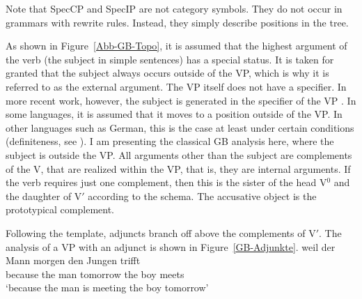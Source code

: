 Note that SpecCP and SpecIP are not category symbols. They do not occur in grammars with rewrite rules. Instead, they simply describe
positions in the tree.%


As shown in Figure~\ref{Abb-GB-Topo}, it is assumed that the highest argument of the verb (the subject in simple sentences) 
has a special status. It is taken for granted that the subject always occurs outside of the VP, which is why it is referred
to as the external argument. The VP itself does not have a specifier. In more recent work, however, the subject
is generated in the specifier of the VP \citep{FS86a-u,KS91a-u}. In some languages, it is assumed that it moves to a position
outside of the VP. In other languages such as German, this is the case at least under certain conditions (\eg definiteness, see
\citealp{Diesing92a}). I am presenting the classical GB analysis here, where the subject is outside the VP. All arguments other than
the subject are complements of the V, that are realized within the VP, that is, they are internal arguments. If the verb requires just one complement, then this is the
sister of the head V$^0$ and the daughter of V$'$ according to the \xbar schema. The accusative object is the prototypical complement.

Following the \xbar template, adjuncts branch off above the complements of V$'$. The analysis of a VP
with an adjunct is shown in Figure~\vref{GB-Adjunkte}.
\ea
\gll weil der Mann morgen den Jungen trifft\\
	 because the man tomorrow the boy meets\\
\glt `because the man is meeting the boy tomorrow'
\z

